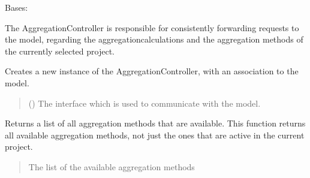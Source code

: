 \documentclass[letterpaper,10pt,english]{sphinxmanual}
\begin{document}
\begin{fulllineitems}
\label{\detokenize{apidoc/src.osm_configurator.control:src.osm_configurator.control.aggregation_controller.AggregationController}}
\pysigstartsignatures
{}
\pysigstopsignatures
\sphinxAtStartPar
Bases: 

\sphinxAtStartPar
The AggregationController is responsible for consistently forwarding requests to the model, regarding the aggregation\sphinxhyphen{}calculations and the aggregation methods of the currently selected project.

\begin{fulllineitems}
\label{\detokenize{apidoc/src.osm_configurator.control:src.osm_configurator.control.aggregation_controller.AggregationController.__init__}}
\pysigstartsignatures
{}
\pysigstopsignatures
\sphinxAtStartPar
Creates a new instance of the AggregationController, with an association to the model.
\begin{quote}\begin{description}
\sphinxAtStartPar
{} ({\hyperref[\detokenize{apidoc/src.osm_configurator.model.application:src.osm_configurator.model.application.application_interface.IApplication}]{}}) \textendash{} The interface which is used to communicate with the model.

\end{description}\end{quote}

\end{fulllineitems}


\begin{fulllineitems}
\label{\detokenize{apidoc/src.osm_configurator.control:src.osm_configurator.control.aggregation_controller.AggregationController.get_aggregation_methods}}
\pysigstartsignatures
{}
\pysigstopsignatures
\sphinxAtStartPar
Returns a list of all aggregation methods that are available.
This function returns all available aggregation methods, not just the ones that are active in the current project.
\begin{quote}\begin{description}
\sphinxAtStartPar
The list of the available aggregation methods


\end{description}
\end{quote}
\end{fulllineitems}
\end{fulllineitems}
\end{document}
